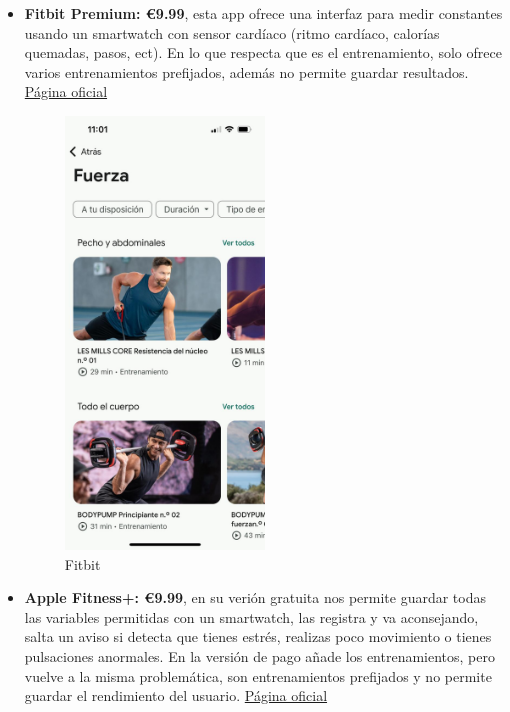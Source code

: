\begin{itemize}
	\item \textbf{Fitbit Premium: €9.99}, esta app ofrece una interfaz para medir constantes usando un smartwatch con sensor cardíaco (ritmo cardíaco, calorías quemadas, pasos, ect). En lo que respecta que es el entrenamiento, solo ofrece varios entrenamientos prefijados, además no permite guardar resultados. \href{https://www.fitbit.com/es/home}{Página oficial}
\begin{figure}[H]
   \centering
    \includegraphics[width=0.5\textwidth]{fotos/fitbit.jpeg}
    \caption{Fitbit}
    \label{fig:Fitbit}
\end{figure} 
	\item \textbf{Apple Fitness+: €9.99}, en su verión gratuita nos permite guardar todas las variables permitidas con un smartwatch, las registra y va aconsejando, salta un aviso si detecta que tienes estrés, realizas poco movimiento o tienes pulsaciones anormales. En la versión de pago añade los entrenamientos, pero vuelve a la misma problemática, son entrenamientos prefijados y no permite guardar el rendimiento del usuario. \href{https://www.apple.com/es/apple-fitness-plus/}{Página oficial}
\begin{figure}[H]
   \centering

\end{figure}
\end{itemize}
